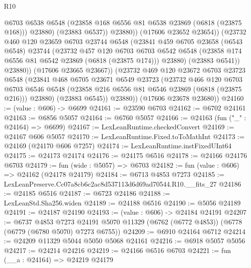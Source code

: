 \begin{lexlean}{R10}
\begin{coremodule}
                      @6703
                      @6538
                      @6548
                      (@23858 @168 @6556 @81 @6538 @23869 (@6818 (@23875 @168)))
                      @23880)
                    (@23883 @6537))
                  @23880))
              (@17606 @23652 @23654))
            (@23732
              @460
              @120
              @23659
              @6703
              @23744
              @6548
              (@23841
                @459
                @6705
                @23658
                (@6543 @6548)
                @23744
                (@23732
                  @457
                  @120
                  @6703
                  @6703
                  @6542
                  @6548
                  (@23858 @174 @6556 @81 @6542 @23869 (@6818 (@23875 @174)))
                  @23880)
                (@23883 @6541))
              @23880))
          (@17606 @23665 @23667))
        (@23732
          @469
          @120
          @23672
          @6703
          @23723
          @6548
          (@23841
            @468
            @6705
            @23671
            @6549
            @23723
            (@23732
              @466
              @120
              @6703
              @6703
              @6546
              @6548
              (@23858 @216 @6556 @81 @6546 @23869 (@6818 (@23875 @216)))
              @23880)
            (@23883 @6545))
          @23880))
      (@17606 @23678 @23680))
@24160 := (value : @606) -> @6699
@24161 := @23590 @6703
@24162 := @6702 @24161
@24163 := @6856 @5057
@24164 := @6760 @5057
@24166 := @24163 (fun ("_" : @24164) => @6699)
@24167 := LexLeanRuntime.checkedConvert
@24169 := @24167 @606 @5057
@24170 := LexLeanRuntime.Fixed.toToMathInt
@24173 := @24169 (@24170 @606 @7257)
@24174 := LexLeanRuntime.instFixedUInt64
@24175 := @24173 @24174
@24176 := @24175 @6516
@24178 := @24166 @24176 @6703
@24179 := fun (wide : @5057) => @6703
@24182 := fun (value : @606) => @24162 (@24178 @24179)
@24184 := @6713 @4853 @7273
@24185 := LexLeanPreserve.Cc07a8cb6c2ac8d537113d6d69ad70544.R10.__fits_27
@24186 := @24185 @6516
@24187 := @6723 @24186
@24188 := LexLeanStd.Sha256.widen
@24189 := @24188 @6516
@24190 := @5056 @24189
@24191 := @24187 @24190
@24193 := (value : @606) -> @24184 @24191
@24207 := @6737
    @4853
    @7273
    @24191
    @5070
    @11329
    (@6762 (@6772 @4853))
    (@6778 (@6779 (@6780 @5070) @7273 @6755))
@24209 := @6910 @24164 @6712
@24214 := @24209 @11329 @5044 @5050 @5068 @24161
@24216 := @6918 @5057 @5056
@24217 := @24214 @24216
@24219 := @24166 @6516 @6703
@24221 := fun (__a : @24164) => @24219 @24179

\end{coremodule}
\end{lexlean}
